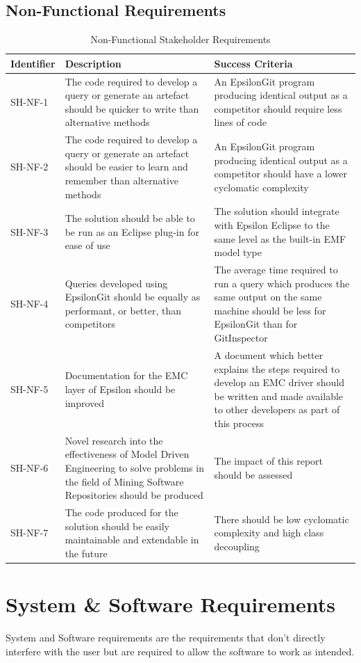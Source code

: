 \documentclass[11pt]{book}
\begin{document}
\subsection{Non-Functional Requirements}
\begin{table}[H]
\centering
\begin{longtable}{|p{2cm}|p{7cm}|p{6cm}|}
\hline
\textbf{Identifier} & \textbf{Description} & \textbf{Success Criteria} \\ \hline
SH-NF-1 & The code required to develop a query or generate an artefact should be quicker to write than alternative methods & An EpsilonGit program producing identical output as a competitor should require less lines of code \\ \hline
SH-NF-2 & The code required to develop a query or generate an artefact should be easier to learn and remember than alternative methods & An EpsilonGit program producing identical output as a competitor should have a lower cyclomatic complexity \\ \hline
SH-NF-3 & The solution should be able to be run as an Eclipse plug-in for ease of use & The solution should integrate with Epsilon Eclipse to the same level as the built-in EMF model type \\ \hline
SH-NF-4 & Queries developed using EpsilonGit should be equally as performant, or better, than competitors & The average time required to run a query which produces the same output on the same machine should be less for EpsilonGit than for GitInspector \\ \hline
SH-NF-5 & Documentation for the EMC layer of Epsilon should be improved & A document which better explains the steps required to develop an EMC driver should be written and made available to other developers as part of this process \\ \hline
SH-NF-6 & Novel research into the effectiveness of Model Driven Engineering to solve problems in the field of Mining Software Repositories should be produced & The impact of this report should be assessed \\ \hline
SH-NF-7 & The code produced for the solution should be easily maintainable and extendable in the future & There should be low cyclomatic complexity and high class decoupling \\ \hline
\end{longtable}
\caption{Non-Functional Stakeholder Requirements}
\label{tab:nonfunctionalstakeholderrequirements}
\end{table}


\section{System \& Software Requirements}
System and Software requirements are the requirements that don't directly interfere with the user but are required to allow the software to work as intended.
\end{document}
